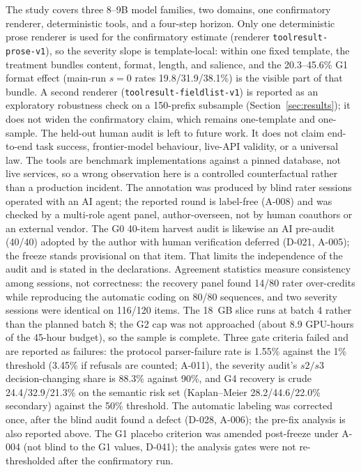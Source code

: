 \documentclass[a4paper,fleqn]{cas-sc}
\begin{document}
The study covers three 8--9B model families, two domains, one confirmatory renderer,
deterministic tools, and a
four-step horizon. Only one deterministic prose renderer is used for the confirmatory estimate
(renderer \texttt{toolresult-prose-v1}),
so the severity slope is template-local: within one fixed template, the treatment bundles content,
format, length, and salience, and the 20.3--45.6\% G1 format effect (main-run $s=0$ rates
19.8/31.9/38.1\%) is the visible part of that bundle. A second renderer
(\texttt{toolresult-fieldlist-v1}) is reported as an exploratory robustness check on a
150-prefix subsample (Section~\ref{sec:results}); it does not widen the confirmatory claim,
which remains one-template and one-sample. The held-out human audit is left to future work. It does not claim end-to-end task success, frontier-model behaviour, live-API
validity, or a universal law. The tools are benchmark implementations against a pinned database,
not live services, so a wrong observation here is a controlled counterfactual rather than a
production incident. The annotation was produced by blind rater sessions operated with an AI
agent; the reported round is label-free (A-008) and was checked by a multi-role agent panel,
author-overseen, not by
human coauthors or an external vendor. The G0 40-item harvest audit is likewise an AI pre-audit
(40/40) adopted by the author with human verification deferred (D-021, A-005); the freeze stands
provisional on that item. That limits the independence of the audit and is stated in
the declarations. Agreement statistics measure consistency among sessions, not correctness: the
recovery panel found 14/80 rater over-credits while reproducing the automatic coding on 80/80
sequences, and two severity sessions were identical on 116/120 items. The 18~GB slice runs at
batch 4 rather than the planned batch 8; the G2 cap was not approached (about 8.9 GPU-hours of the
45-hour budget), so the sample is complete. Three gate criteria failed and are reported as
failures: the protocol parser-failure rate is 1.55\% against the 1\% threshold (3.45\% if refusals are
counted; A-011), the severity audit's $s2/s3$ decision-changing share is 88.3\% against 90\%, and G4
recovery is crude 24.4/32.9/21.3\% on the semantic risk set (Kaplan--Meier 28.2/44.6/22.0\% secondary) against the 50\% threshold. The
automatic labeling was
corrected once, after the blind audit found a defect (D-028, A-006); the pre-fix analysis is also
reported
above. The G1 placebo criterion was amended post-freeze under A-004 (not blind to the G1 values,
D-041); the analysis gates were not re-thresholded after the confirmatory run.
\end{document}
